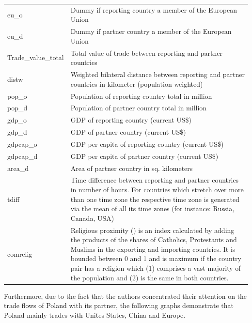 \documentclass{Trade_template}
\numberwithin{equation}{section}
\begin{document}
\begin{table}[H]
{\begin{tabularx}{\textwidth}{@{} M X  @{}}
eu\_o & Dummy if reporting country a member of the European Union \\
eu\_d & Dummy if partner country a member of the European Union \\
Trade\_value\_total & Total value of trade between reporting and partner countries \\
distw & Weighted bilateral distance between reporting and partner countries in kilometer (population weighted) \\
pop\_o & Population of reporting country total in million \\
pop\_d & Population of partner country total in million \\
gdp\_o & GDP of reporting country (current US\$) \\
gdp\_d & GDP of partner country (current US\$) \\
gdpcap\_o & GDP per capita of reporting country (current US\$) \\
gdpcap\_d & GDP per capita of partner country (current US\$) \\
area\_d & Area of partner country in sq. kilometers \\
tdiff & Time difference between reporting and partner countries in number of hours. For countries which stretch over more than  one  time  zone   the  respective  time  zone  is generated via the mean of all its time zones (for instance: Russia, Canada, USA) \\
comrelig & Religious proximity (\citet{disdier2007je}) is an index calculated by adding the products of the shares of Catholics, Protestants and Muslims in the exporting and importing countries. It is bounded between 0 and 1 and is maximum if the country pair has a religion which (1) comprises a vast majority of the population and (2) is the same in both countries. \\ \bottomrule
\end{tabularx}}
\end{table}

\newpage

Furthermore, due to the fact that the authors concentrated their attention on the trade flows of Poland with its partner, the following graphs demonstrate that Poland mainly trades with Unites States, China and Europe.
\end{document}
